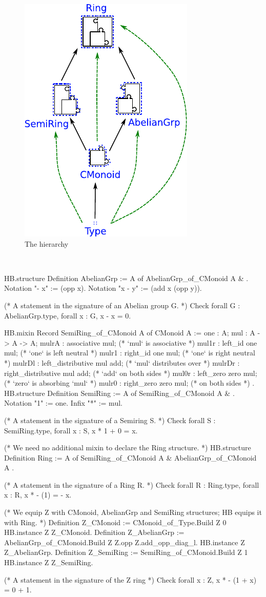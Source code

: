 \documentclass{easychair}
\begin{document}
\begin{figure}
  \vspace{1em}
  \includegraphics[width=.35\textwidth]{diagram.pdf}
  \vspace{-1.5em}
  \caption{The hierarchy}
  \label{fig:hierarchy}
\end{figure}
\
\begin{coqcode}
HB.structure Definition AbelianGrp := { A of AbelianGrp_of_CMonoid A & }.
Notation "- x"   := (opp x).
Notation "x - y" := (add x (opp y)).

(* A statement in the signature of an Abelian group G. *)
Check forall G : AbelianGrp.type, forall x : G, x - x = 0.

HB.mixin Record SemiRing_of_CMonoid A of CMonoid A := {
  one    : A;
  mul    : A -> A -> A;
  mulrA  : associative mul;  (* `mul` is associative   *)
  mul1r  : left_id one mul;  (* `one` is left neutral  *)
  mulr1  : right_id one mul; (* `one` is right neutral *)
  mulrDl : left_distributive mul add;  (* `mul` distributes over *)
  mulrDr : right_distributive mul add; (*   `add` on both sides  *)
  mul0r  : left_zero zero mul;  (* `zero` is absorbing `mul`     *)
  mulr0  : right_zero zero mul; (*   on both sides               *)
}.
HB.structure Definition SemiRing := { A of SemiRing_of_CMonoid A & }.
Notation "1"  := one.
Infix    "*"  := mul.

(* A statement in the signature of a Semiring S.  *)
Check forall S : SemiRing.type, forall x : S, x * 1 + 0 = x.

(* We need no additional mixin to declare the Ring structure. *)
HB.structure Definition Ring := { A of SemiRing_of_CMonoid A & AbelianGrp_of_CMonoid A }.

(* A statement in the signature of a Ring R.  *)
Check forall R : Ring.type, forall x : R, x * - (1) = - x.

(* We equip Z with CMonoid, AbelianGrp and SemiRing structures; HB equips it with Ring. *)
Definition Z_CMonoid    := CMonoid_of_Type.Build Z 0%
HB.instance Z Z_CMonoid.
Definition Z_AbelianGrp := AbelianGrp_of_CMonoid.Build Z Z.opp Z.add_opp_diag_l.
HB.instance Z Z_AbelianGrp.
Definition Z_SemiRing   := SemiRing_of_CMonoid.Build Z 1%
HB.instance Z Z_SemiRing.

(* A statement in the signature of the Z ring *)
Check forall x : Z, x * - (1 + x) = 0 + 1.
\end{coqcode}
\end{document}
